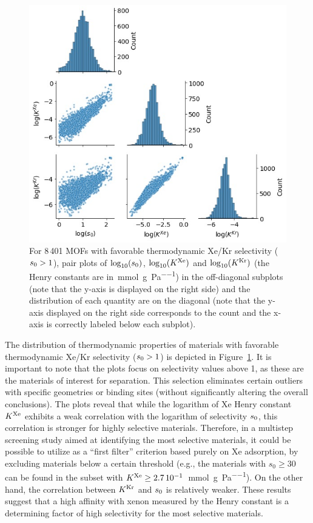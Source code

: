 \documentclass[main.tex]{subfiles}
\begin{document}
\begin{figure}[ht]
\centering
  \includegraphics[width=0.6\linewidth]{figures/2-thermo/Henry_0.jpg}
  \caption{For 8\,401 MOFs with favorable thermodynamic Xe/Kr selectivity ($s_{\text{0}} > 1$), pair plots of $\log_{\text{10}}(s_{\text{0}})$, $\log_{\text{10}}(K^{\text{Xe}})$ and $\log_{\text{10}}(K^{\text{Kr}})$ (the Henry constants are in~\si{\milli\mol\per\gram\per\pascal}) in the off-diagonal subplots (note that the y-axis is displayed on the right side) and the distribution of each quantity are on the diagonal (note that the y-axis displayed on the right side corresponds to the count and the x-axis is correctly labeled below each subplot).}\label{fgr:histo_K}
\end{figure}


The distribution of thermodynamic properties of materials with favorable thermodynamic Xe/Kr selectivity ($s_{\text{0}} > 1$) is depicted in Figure~\ref{fgr:histo_K}. It is important to note that the plots focus on selectivity values above 1, as these are the materials of interest for separation. This selection eliminates certain outliers with specific geometries or binding sites (without significantly altering the overall conclusions). The plots reveal that while the logarithm of Xe Henry constant $K^{\text{Xe}}$ exhibits a weak correlation with the logarithm of selectivity $s_{\text{0}}$, this correlation is stronger for highly selective materials. Therefore, in a multistep screening study aimed at identifying the most selective materials, it could be possible to utilize as a ``first filter'' criterion based purely on Xe adsorption, by excluding materials below a certain threshold (e.g., the materials with $s_0\ge30$ can be found in the subset with $K^{\text{Xe}}\ge2.7\,10^{-1}$~\si{\milli\mol\per\gram\per\pascal}). On the other hand, the correlation between $K^{\text{Kr}}$ and $s_{\text{0}}$ is relatively weaker. These results suggest that a high affinity with xenon measured by the Henry constant is a determining factor of high selectivity for the most selective materials.  
\end{document}
